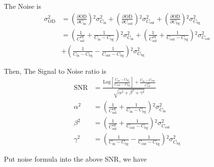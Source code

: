 The Noise is
\begin{equation}
\begin{split}
\sigma _{\text{OD}}^2&=\left(\frac{\partial \text{OD}}{\partial C_{\text{in}}}\right){}^2\sigma _{C_{\text{in}}}^2+\left(\frac{\partial \text{OD}}{\partial C_{\text{out}}}\right){}^2\sigma _{C_{\text{out}}}^2+\left(\frac{\partial \text{OD}}{\partial C_{\text{bg}}}\right){}^2\sigma _{C_{\text{bg}}}^2\\
&=\left(\frac{1}{C_{\text{sat}}^{\text{eff}}}+\frac{1}{C_{\text{in}}-C_{\text{bg}}}\right){}^2\sigma _{C_{\text{in}}}^2+\left(\frac{1}{C_{\text{sat}}^{\text{eff}}}+\frac{1}{C_{\text{out}}-C_{\text{bg}}}\right){}^2\sigma_{C_{\text{out}}}^2\\
&+\left(\frac{1}{C_{\text{in}}-C_{\text{bg}}}-\frac{1}{C_{\text{out}}-C_{\text{bg}}}\right){}^2\sigma _{C_{\text{bg}}}^2
\end{split}
\end{equation}

Then, The Signal to Noise ratio is
\begin{equation}
\begin{split}
\text{SNR}&=\frac{\text{Log}\left[\frac{C_{\text{in}}-C_{\text{bg}}}{C_{\text{out}}-C_{\text{bg}}}\right]+\frac{C_{\text{in}}-C_{\text{out}}}{C_{\text{sat}}^{\text{eff}}}}{\sqrt{\alpha^2+\beta^2+\gamma^2}}\\
\alpha^2&=\left(\frac{1}{C_{\text{sat}}^{\text{eff}}}+\frac{1}{C_{\text{in}}-C_{\text{bg}}}\right){}^2\sigma_{C_{\text{in}}}^2\\
\beta^2&=\left(\frac{1}{C_{\text{sat}}^{\text{eff}}}+\frac{1}{C_{\text{out}}-C_{\text{bg}}}\right){}^2\sigma _{C_{\text{out}}}^2\\
\gamma^2&=\left(\frac{1}{C_{\text{in}}-C_{\text{bg}}}-\frac{1}{C_{\text{out}}-C_{\text{bg}}}\right){}^2\sigma
_{C_{\text{bg}}}^2
\end{split}
\end{equation}

Put noise formula into the above SNR, we have

